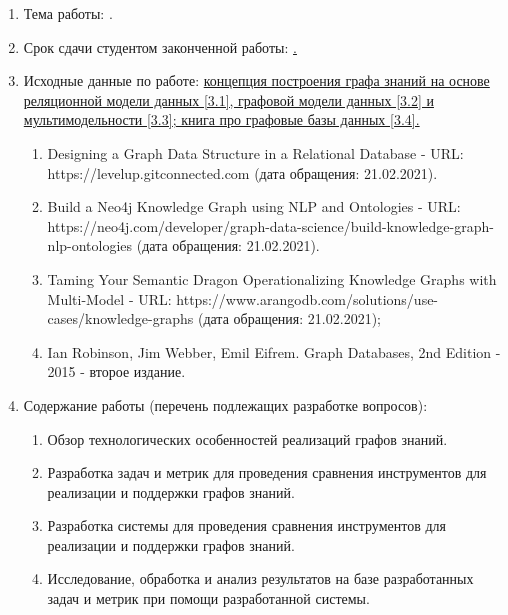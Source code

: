 \begin{enumerate}[1.]
\item Тема работы: {\expandafter \ulined \thesisTitle.}
\item Срок сдачи студентом законченной работы: \uline{\thesisDeadline.}
\item Исходные данные по работе: \uline{концепция построения графа знаний на основе реляционной модели данных [3.1], графовой модели данных [3.2] и мультимодельности [3.3]; книга про графовые базы данных [3.4].}
\begin{enumerate}[label=\theenumi\arabic*.]
\item Designing a Graph Data Structure in a Relational Database - URL: https://levelup.gitconnected.com (дата обращения: 21.02.2021).
\item Build a Neo4j Knowledge Graph using NLP and Ontologies - URL: https://neo4j.com/developer/graph-data-science/build-knowledge-graph-nlp-ontologies (дата обращения: 21.02.2021).
\item Taming Your Semantic Dragon Operationalizing Knowledge Graphs with Multi-Model - URL: https://www.arangodb.com/solutions/use-cases/knowledge-graphs (дата обращения: 21.02.2021);
\item Ian Robinson, Jim Webber, Emil Eifrem. Graph Databases, 2nd Edition - 2015 - второе издание.
\end{enumerate}
\item Содержание работы (перечень подлежащих разработке вопросов):
\begin{enumerate}[label=\theenumi\arabic*.]
\item Обзор технологических особенностей реализаций графов знаний.
\item Разработка задач и метрик для проведения сравнения инструментов для реализации и поддержки графов знаний.
\item Разработка системы для проведения сравнения инструментов для реализации и поддержки графов знаний.
\item Исследование, обработка и анализ результатов на базе разработанных задач и метрик при помощи разработанной системы.
\end{enumerate}

\end{enumerate}
